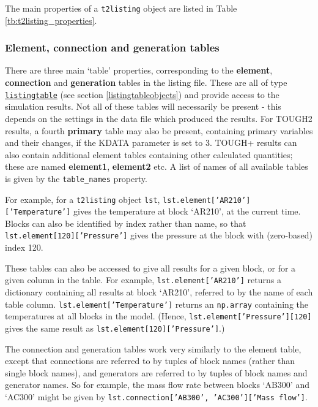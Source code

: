 The main properties of a \texttt{t2listing} object are listed in Table \ref{tb:t2listing_properties}.

\subsubsection{Element, connection and generation tables}

There are three main `table' properties, corresponding to the \textbf{element}, \textbf{connection} and \textbf{generation} tables in the listing file.  These are all of type \hyperref[listingtableobjects]{\texttt{listingtable}} (see section \ref{listingtableobjects}) and provide access to the simulation results.  Not all of these tables will necessarily be present - this depends on the settings in the data file which produced the results.  For TOUGH2 results, a fourth \textbf{primary} table may also be present, containing primary variables and their changes, if the KDATA parameter is set to 3.   TOUGH+ results can also contain additional element tables containing other calculated quantities; these are named \textbf{element1}, \textbf{element2} etc.  A list of names of all available tables is given by the \texttt{table\_names} property.

For example, for a \texttt{t2listing} object \texttt{lst}, \texttt{lst.element['AR210']['Temperature']} gives the temperature at block `AR210', at the current time.  Blocks can also be identified by index rather than name, so that \texttt{lst.element[120]['Pressure']} gives the pressure at the block with (zero-based) index 120.

These tables can also be accessed to give all results for a given block, or for a given column in the table.  For example, \texttt{lst.element['AR210']} returns a dictionary containing all results at block `AR210', referred to by the name of each table column.  \texttt{lst.element['Temperature']} returns an \texttt{np.array} containing the temperatures at all blocks in the model.  (Hence, \texttt{lst.element['Pressure'][120]} gives the same result as \texttt{lst.element[120]['Pressure']}.)

The connection and generation tables work very similarly to the element table, except that connections are referred to by tuples of block names (rather than single block names), and generators are referred to by tuples of block names and generator names.  So for example, the mass flow rate between blocks `AB300' and `AC300' might be given by \texttt{lst.connection['AB300', 'AC300']['Mass flow']}.

